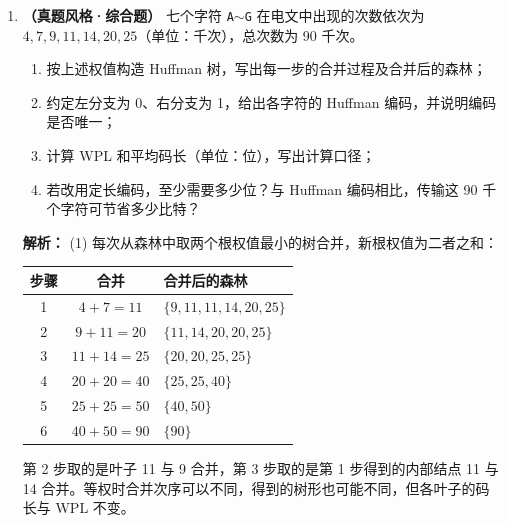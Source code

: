 \begin{enumerate}[resume]
\item \textbf{（真题风格·综合题）} 七个字符 \texttt{A}$\sim$\texttt{G} 在电文中出现的次数依次为 $4,7,9,11,14,20,25$（单位：千次），总次数为 90 千次。
\begin{enumerate}
    \item[(1)] 按上述权值构造 Huffman 树，写出每一步的合并过程及合并后的森林；
    \item[(2)] 约定左分支为 0、右分支为 1，给出各字符的 Huffman 编码，并说明编码是否唯一；
    \item[(3)] 计算 WPL 和平均码长（单位：位），写出计算口径；
    \item[(4)] 若改用定长编码，至少需要多少位？与 Huffman 编码相比，传输这 90 千个字符可节省多少比特？
\end{enumerate}

\ifshowsolutions\par\noindent\textbf{解析：}
(1) 每次从森林中取两个根权值最小的树合并，新根权值为二者之和：
\begin{center}
\begin{tabular}{ccl}
\toprule
步骤 & 合并 & 合并后的森林 \\
\midrule
1 & $4+7=11$ & $\{9,11,11,14,20,25\}$ \\
2 & $9+11=20$ & $\{11,14,20,20,25\}$ \\
3 & $11+14=25$ & $\{20,20,25,25\}$ \\
4 & $20+20=40$ & $\{25,25,40\}$ \\
5 & $25+25=50$ & $\{40,50\}$ \\
6 & $40+50=90$ & $\{90\}$ \\
\bottomrule
\end{tabular}
\end{center}
第 2 步取的是叶子 11 与 9 合并，第 3 步取的是第 1 步得到的内部结点 11 与 14 合并。等权时合并次序可以不同，得到的树形也可能不同，但各叶子的码长与 WPL 不变。


\end{enumerate}
